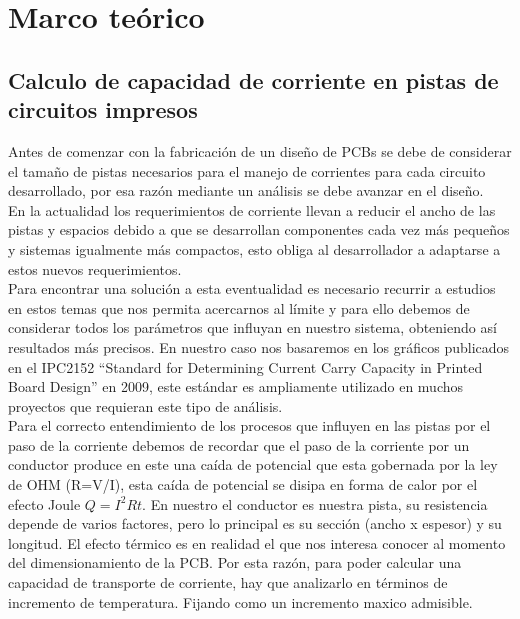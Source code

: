 

\chapter{Marco teórico}

\section{Calculo de capacidad de corriente en pistas de circuitos impresos}



Antes de comenzar con la fabricación de un diseño de PCBs se debe de considerar el tamaño de pistas necesarios para el manejo de corrientes para cada circuito desarrollado, por esa razón mediante un análisis se debe avanzar en el diseño.\\

En la actualidad los requerimientos de corriente llevan a reducir el ancho de las pistas y espacios debido a que se desarrollan componentes cada vez más pequeños y sistemas igualmente más compactos, esto obliga al desarrollador a adaptarse a estos nuevos requerimientos.\\

Para encontrar una solución a esta eventualidad es necesario recurrir a estudios en estos temas que nos permita acercarnos al límite y para ello debemos de considerar todos los parámetros que influyan en nuestro sistema, obteniendo así resultados más precisos. En nuestro caso nos basaremos en los gráficos publicados en el IPC2152 \cite{IPC 2152} ``Standard for Determining Current Carry Capacity in Printed Board Design'' en 2009, este estándar es ampliamente utilizado en muchos proyectos que requieran este tipo de análisis. \\

Para el correcto entendimiento de los procesos que influyen en las pistas por el paso de la corriente debemos de recordar que el paso de la corriente por un conductor produce en este una caída de potencial que esta gobernada por la ley de OHM (R=V/I), esta caída de potencial se disipa en forma de calor por el efecto Joule $Q=I^{2}Rt$. En nuestro el conductor es nuestra pista, su resistencia depende de varios factores, pero lo principal es su sección (ancho x espesor) y su longitud. El efecto térmico es en realidad el que nos interesa conocer al momento del dimensionamiento de la PCB. Por esta razón, para poder calcular una capacidad de transporte de corriente, hay que analizarlo en términos de incremento de temperatura. Fijando como un incremento maxico admisible.\\

